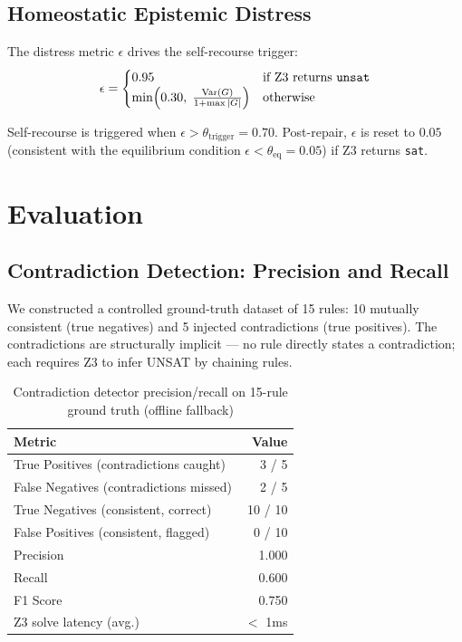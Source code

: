\documentclass[sigconf]{acmart}
\begin{document}
\subsection{Homeostatic Epistemic Distress}

The distress metric $\epsilon$ drives the self-recourse trigger:
\begin{equation}
  \epsilon = \begin{cases}
    0.95 & \text{if Z3 returns \texttt{unsat}} \\
    \min\!\left(0.30,\; \frac{\text{Var}(G)}{1 + \max|G|}\right) & \text{otherwise}
  \end{cases}
\label{eq:distress}
\end{equation}

Self-recourse is triggered when $\epsilon > \theta_{\text{trigger}} = 0.70$. Post-repair, $\epsilon$ is reset to $0.05$ (consistent with the equilibrium condition $\epsilon < \theta_{\text{eq}} = 0.05$) if Z3 returns \texttt{sat}.

\section{Evaluation}

\subsection{Contradiction Detection: Precision and Recall}

We constructed a controlled ground-truth dataset of 15 rules: 10 mutually consistent (true negatives) and 5 injected contradictions (true positives). The contradictions are structurally implicit --- no rule directly states a contradiction; each requires Z3 to infer UNSAT by chaining rules.

\begin{table}[h]
\caption{Contradiction detector precision/recall on 15-rule ground truth (offline fallback)}
\begin{tabular}{lr}
\toprule
Metric & Value \\
\midrule
True Positives  (contradictions caught) & 3 / 5 \\
False Negatives (contradictions missed) & 2 / 5 \\
True Negatives  (consistent, correct)   & 10 / 10 \\
False Positives (consistent, flagged)   & 0 / 10 \\
Precision & 1.000 \\
Recall    & 0.600 \\
F1 Score  & 0.750 \\
Z3 solve latency (avg.) & $<$ 1ms \\
\bottomrule
\end{tabular}
\label{tab:precision}
\end{table}
\end{document}
